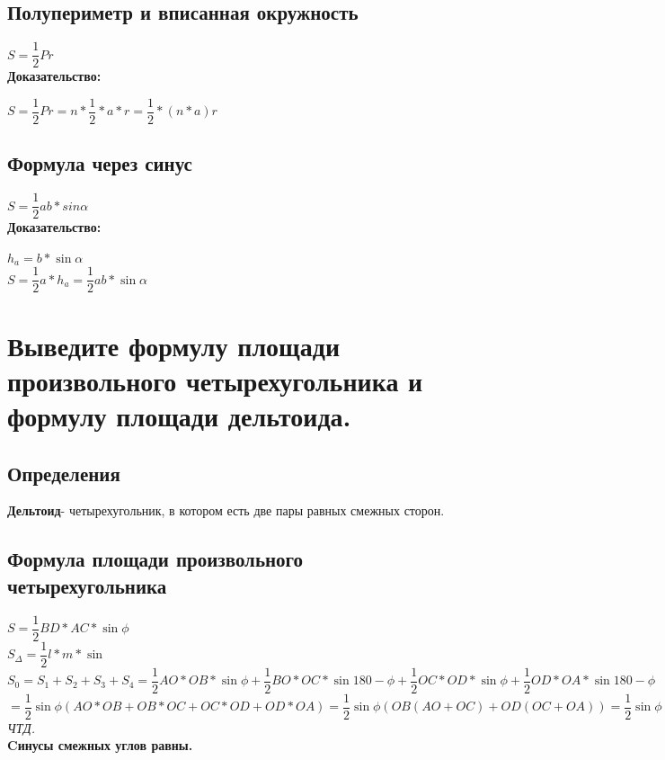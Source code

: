 \documentclass[12pt, letterpaper]{article}
\begin{document}
\subsection {Полупериметр и вписанная окружность}
$S=\dfrac{1}{2}Pr$ \\
\textbf{Доказательство:} \\
\begin{flushleft}
$S=\dfrac{1}{2}Pr=n*\dfrac{1}{2}*a*r=\dfrac{1}{2}*(n*a)r$ \\
\end{flushleft}

\subsection {Формула через синус}
$S=\dfrac{1}{2}ab*sin\alpha $ \\
\textbf{Доказательство:} \\
\begin{flushleft}
$h_a=b*\sin \alpha $ \\
$S=\dfrac{1}{2} a*h_a= \dfrac{1}{2}ab*\sin \alpha $ \\
\end{flushleft}


\section {Выведите формулу площади произвольного четырехугольника и формулу площади дельтоида.}
\subsection{Определения}
\textbf{Дельтоид}- четырехугольник, в котором есть две пары равных смежных сторон. \\

\subsection{Формула площади произвольного четырехугольника}

$S=\dfrac{1}{2}BD*AC*\sin{\phi}$\\
$S_\Delta=\dfrac{1}{2}l*m*\sin{}$\\
$S_0 = S_1 + S_2 + S_3 + S_4 = \dfrac{1}{2}AO*OB * \sin{\phi} + \dfrac{1}{2}BO*OC*\sin{180-\phi} + \dfrac{1}{2}OC*OD*\sin{\phi} + \dfrac{1}{2}OD*OA*\sin{180-\phi}$
$=\dfrac{1}{2}\sin{\phi}(AO*OB+OB*OC+OC*OD+OD*OA)=\dfrac{1}{2}\sin{\phi}(OB(AO+OC)+OD(OC+OA))=\dfrac{1}{2}\sin{\phi}(OB+OD)(AO+OC)=\dfrac{1}{2}\sin{\phi}BD*AC$ \\
\textit{ЧТД.}\\
\textbf{Cинусы смежных углов равны.}
\end{document}
